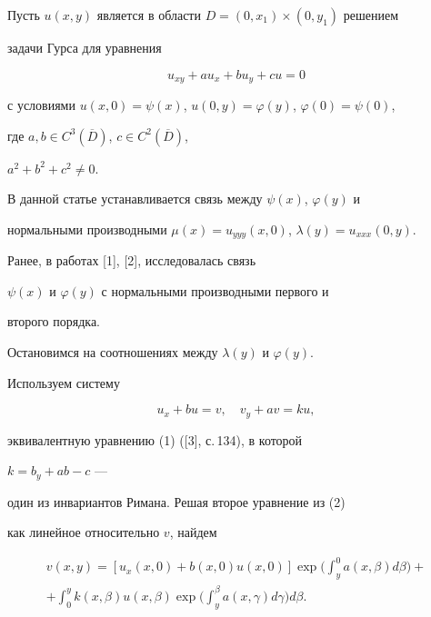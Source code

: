 Пусть $u(x,y)$ является в области $D=(0,x_{1})\times(0,y_{1})$ решением


задачи Гурса для уравнения


\begin{equation}


u_{xy}+au_{x}+bu_{y}+cu=0


\end{equation}


с условиями $u(x,0)=\psi(x)$, $u(0,y)=\varphi(y)$, $\varphi(0)=\psi(0)$,


где $a,b\in C^{3}(\overline{D})$, $c\in C^{2}(\overline{D})$,


$a^{2}+b^{2}+c^{2}\ne0$.


В данной статье устанавливается связь между $\psi(x)$, $\varphi(y)$ и


нормальными производными $\mu(x)=u_{yyy}(x,0)$, $\lambda(y) =u_{xxx}(0,y)$. 


Ранее, в работах [1], [2], исследовалась связь


$\psi(x)$ и $\varphi(y)$ с нормальными производными первого и


второго порядка.





Остановимся на соотношениях между $\lambda(y)$ и $\varphi(y)$.


Используем систему


\begin{equation}


u_{x}+bu=v,\quad v_{y}+av=ku,


\end{equation}


эквивалентную уравнению (1) ([3], с.\,134), в которой


$k=b_{y}+ab-c$ ---


один из инвариантов Римана. Решая второе уравнение из (2)


как линейное относительно $v$, найдем


\begin{multline}


v(x,y)=[ u_{x}(x,0)+b(x,0)u(x,0)] \exp\bigg(


\int_{y}^{0} a(x,\beta)d\beta\bigg)+\\


%


+\int_{0}^{y} k(x,\beta)u(x,\beta)\exp \bigg(\int_{y}^{\beta}


a(x,\gamma)d\gamma \bigg) d\beta.


\end{multline}


